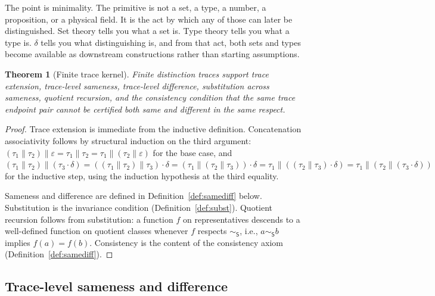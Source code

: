 \documentclass[11pt,a4paper]{article}
\newtheorem{theorem}{Theorem}[section]
\theoremstyle{definition}
\theoremstyle{remark}
\begin{document}
The point is minimality. The primitive is not a set, a type, a number, a
proposition, or a physical field. It is the act by which any of those can later
be distinguished. Set theory tells you what a set is. Type theory tells you
what a type is. $\delta$ tells you what distinguishing is, and from that act,
both sets and types become available as downstream constructions rather than
starting assumptions.

\begin{theorem}[Finite trace kernel]\label{thm:kernel}
Finite distinction traces support trace extension, trace-level sameness,
trace-level difference, substitution across sameness, quotient recursion, and
the consistency condition that the same trace endpoint pair cannot be certified
both same and different in the same respect.
\end{theorem}

\begin{proof}
Trace extension is immediate from the inductive definition. Concatenation
associativity follows by structural induction on the third argument:
$(\tau_1 \mathbin{\|} \tau_2) \mathbin{\|} \varepsilon
  = \tau_1 \mathbin{\|} \tau_2
  = \tau_1 \mathbin{\|} (\tau_2 \mathbin{\|} \varepsilon)$
for the base case, and
$(\tau_1 \mathbin{\|} \tau_2) \mathbin{\|} (\tau_3 \cdot \delta)
  = ((\tau_1 \mathbin{\|} \tau_2) \mathbin{\|} \tau_3) \cdot \delta
  = (\tau_1 \mathbin{\|} (\tau_2 \mathbin{\|} \tau_3)) \cdot \delta
  = \tau_1 \mathbin{\|} ((\tau_2 \mathbin{\|} \tau_3) \cdot \delta)
  = \tau_1 \mathbin{\|} (\tau_2 \mathbin{\|} (\tau_3 \cdot \delta))$
for the inductive step, using the induction hypothesis at the third equality.

Sameness and difference are defined in Definition~\ref{def:samediff} below.
Substitution is the invariance condition (Definition~\ref{def:subst}).
Quotient recursion follows from substitution: a function $f$ on representatives
descends to a well-defined function on quotient classes whenever $f$ respects
$\sim_{\mathsf{S}}$, i.e., $a \sim_{\mathsf{S}} b$ implies $f(a) = f(b)$.
Consistency is the content of the consistency axiom
(Definition~\ref{def:samediff}).
\end{proof}

\subsection{Trace-level sameness and difference}
\end{document}
